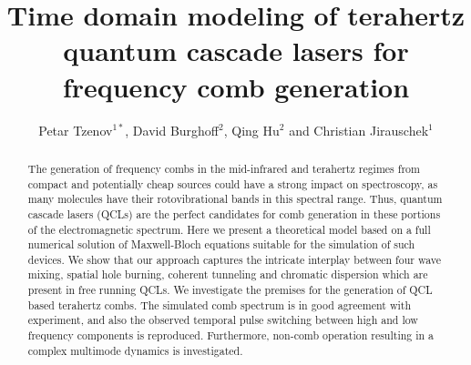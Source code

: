 \documentclass[10pt,letterpaper]{article}%
\begin{document}
\title{Time domain modeling of terahertz quantum cascade lasers for frequency comb generation}
\author{Petar Tzenov$^{1*}$, David Burghoff$^{2}$, Qing Hu$^{2}$ and Christian
Jirauschek$^{1}$}

\address{$^{1}$ Institute for Nanoelectronics, Technical University of Munich,
	D-80333 Munich, Germany} 
\address{$^{2}$ Department of Electrical Engineering
	and Computer Science, Research Laboratory of Electronics, Massachusetts
	Institute of Technology, Cambridge, Massachusetts 02139, USA}


\begin{abstract}
The generation of frequency combs in the mid-infrared and terahertz regimes
from compact and potentially cheap sources could have a strong impact on
spectroscopy, as many molecules have their rotovibrational bands in this
spectral range. Thus, quantum cascade lasers (QCLs) are the perfect candidates
for comb generation in these portions of the electromagnetic spectrum. Here we
present a theoretical model based on a full numerical solution of
Maxwell-Bloch equations suitable for the simulation of such devices. We show
that our approach captures the intricate interplay between four wave mixing,
spatial hole burning, coherent tunneling and chromatic dispersion which are
present in free running QCLs. We investigate the premises for the generation
of QCL based terahertz combs. The simulated comb spectrum is in good agreement
with experiment, and also the observed temporal pulse switching between high
and low frequency components is reproduced. Furthermore, non-comb operation
resulting in a complex multimode dynamics is investigated.
\end{abstract}










\end{document}
